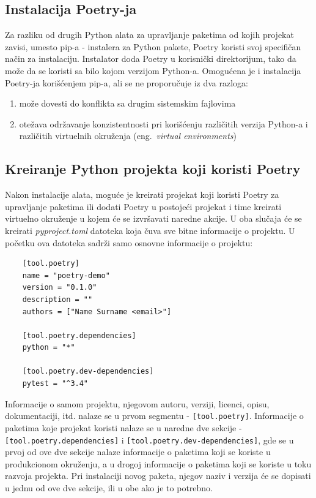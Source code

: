 \documentclass[12pt]{report}
\begin{document}
\subsection{Instalacija Poetry-ja}
Za razliku od drugih Python alata za upravljanje paketima od kojih projekat zavisi, umesto pip-a - instalera za Python pakete, Poetry koristi svoj specifičan način za instalaciju. Instalator doda Poetry u korisnički direktorijum, tako da može da se koristi sa bilo kojom verzijom Python-a. Omogućena je i instalacija Poetry-ja korišćenjem pip-a, ali se ne proporučuje iz dva razloga:

\begin{enumerate}
    \item može dovesti do konflikta sa drugim sistemskim fajlovima
    \item otežava održavanje konzistentnosti pri korišćenju različitih verzija Python-a i različitih virtuelnih okruženja (eng.\ \textit{virtual environments})
\end{enumerate}

\subsection{Kreiranje Python projekta koji koristi Poetry}
Nakon instalacije alata, moguće je kreirati projekat koji koristi Poetry za upravljanje paketima ili dodati Poetry u postojeći projekat i time kreirati virtuelno okruženje u kojem će se izvršavati naredne akcije. U oba slučaja će se kreirati \textit{pyproject.toml} datoteka koja čuva sve bitne informacije o projektu. U početku ova datoteka sadrži samo osnovne informacije o projektu:

\begin{samepage}
    \begin{verbatim}
    [tool.poetry]
    name = "poetry-demo"
    version = "0.1.0"
    description = ""
    authors = ["Name Surname <email>"]

    [tool.poetry.dependencies]
    python = "*"

    [tool.poetry.dev-dependencies]
    pytest = "^3.4"
    \end{verbatim}
\end{samepage}

Informacije o samom projektu, njegovom autoru, verziji, licenci, opisu, dokumentaciji, itd. nalaze se u prvom segmentu - \texttt{[tool.poetry]}. Informacije o paketima koje projekat koristi nalaze se u naredne dve sekcije - \texttt{[tool.poetry.dependencies]} i \texttt{[tool.poetry.dev-dependencies]}, gde se u prvoj od ove dve sekcije nalaze informacije o paketima koji se koriste u produkcionom okruženju, a u drogoj informacije o paketima koji se koriste u toku razvoja projekta. Pri instalaciji novog paketa, njegov naziv i verzija će se dopisati u jednu od ove dve sekcije, ili u obe ako je to potrebno.
\end{document}
